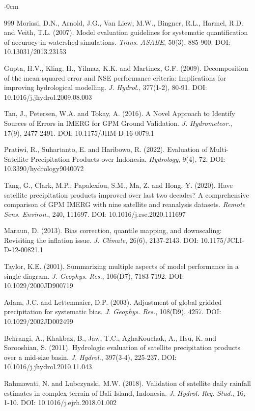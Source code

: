 \documentclass[remotesensing,article,submit,pdftex,moreauthors]{Definitions/mdpi}
\begin{document}
\begin{adjustwidth}{-\extralength}{0cm}
\begin{thebibliography}{999}
 Moriasi, D.N., Arnold, J.G., Van Liew, M.W., Bingner, R.L.,
Harmel, R.D. and Veith, T.L. (2007). Model evaluation guidelines for
systematic quantification of accuracy in watershed simulations.
\emph{Trans. ASABE}, 50(3), 885-900. DOI: 10.13031/2013.23153

 Gupta, H.V., Kling, H., Yilmaz, K.K. and Martinez, G.F. (2009).
Decomposition of the mean squared error and NSE performance criteria:
Implications for improving hydrological modelling. \emph{J. Hydrol.},
377(1-2), 80-91. DOI: 10.1016/j.jhydrol.2009.08.003

 Tan, J., Petersen, W.A. and Tokay, A. (2016). A Novel Approach
to Identify Sources of Errors in IMERG for GPM Ground Validation.
\emph{J. Hydrometeor.}, 17(9), 2477-2491. DOI: 10.1175/JHM-D-16-0079.1

 Pratiwi, R., Suhartanto, E. and Haribowo, R. (2022). Evaluation
of Multi-Satellite Precipitation Products over Indonesia.
\emph{Hydrology}, 9(4), 72. DOI: 10.3390/hydrology9040072

 Tang, G., Clark, M.P., Papalexiou, S.M., Ma, Z. and Hong, Y.
(2020). Have satellite precipitation products improved over last two
decades? A comprehensive comparison of GPM IMERG with nine satellite and
reanalysis datasets. \emph{Remote Sens. Environ.}, 240, 111697. DOI:
10.1016/j.rse.2020.111697

 Maraun, D. (2013). Bias correction, quantile mapping, and
downscaling: Revisiting the inflation issue. \emph{J. Climate}, 26(6),
2137-2143. DOI: 10.1175/JCLI-D-12-00821.1

 Taylor, K.E. (2001). Summarizing multiple aspects of model
performance in a single diagram. \emph{J. Geophys. Res.}, 106(D7),
7183-7192. DOI: 10.1029/2000JD900719

 Adam, J.C. and Lettenmaier, D.P. (2003). Adjustment of global
gridded precipitation for systematic bias. \emph{J. Geophys. Res.},
108(D9), 4257. DOI: 10.1029/2002JD002499

 Behrangi, A., Khakbaz, B., Jaw, T.C., AghaKouchak, A., Hsu, K.
and Sorooshian, S. (2011). Hydrologic evaluation of satellite
precipitation products over a mid-size basin. \emph{J. Hydrol.},
397(3-4), 225-237. DOI: 10.1016/j.jhydrol.2010.11.043

 Rahmawati, N. and Lubczynski, M.W. (2018). Validation of
satellite daily rainfall estimates in complex terrain of Bali Island,
Indonesia. \emph{J. Hydrol. Reg. Stud.}, 16, 1-10. DOI:
10.1016/j.ejrh.2018.01.002


\end{thebibliography}
\end{adjustwidth}
\end{document}
